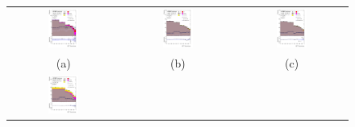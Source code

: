 \documentclass[PAPER, coverpage, atlasdraft=true, texlive=2016, UKenglish]{\ATLASLATEXPATH atlasdoc} %
\providecommand{\DIFaddbeginFL}{} %
\providecommand{\DIFaddendFL}{} %
\providecommand{\DIFdelbeginFL}{} %
\providecommand{\DIFdelendFL}{} %
\begin{document}
\begin{figure}[H]
\begin{tabular}{@{}ccc@{}}
\DIFdelbeginFL %
\DIFdelendFL \DIFaddbeginFL \includegraphics[width=0.29\textwidth]{figures/tuH_reg1l2tau1bnj_os.pdf}\DIFaddendFL &
\DIFdelbeginFL %
\DIFdelendFL \DIFaddbeginFL \includegraphics[width=0.29\textwidth]{figures/tuH_reg1l1tau1b1j_ss.pdf}\DIFaddendFL &
\DIFdelbeginFL %
\DIFdelendFL \DIFaddbeginFL \includegraphics[width=0.29\textwidth]{figures/tuH_reg1l1tau1b2j_ss.pdf}\DIFaddendFL \\
(a)  & (b) & (c) \\
\DIFdelbeginFL %
\DIFdelendFL \DIFaddbeginFL \includegraphics[width=0.29\textwidth]{figures/tuH_reg1l1tau1b2j_os.pdf}\DIFaddendFL &

\end{tabular}
\end{figure}
\end{document}
